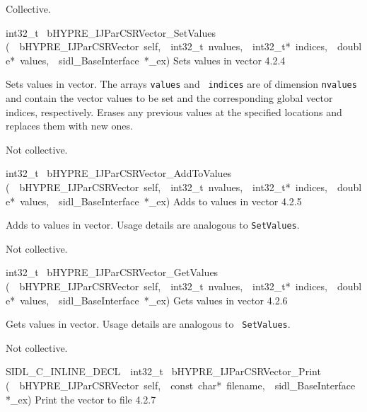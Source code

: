 \documentclass{article}
\begin{document}
\begin{cxxentry}
\begin{cxxentry}
\begin{cxxfunction}
\begin{cxxdoc}
Collective.
\end{cxxdoc}
\end{cxxfunction}
\begin{cxxfunction}
{int32\_t\ }
        {bHYPRE\_IJParCSRVector\_SetValues}
        {(\ \ bHYPRE\_IJParCSRVector\ self,\ \ int32\_t\ nvalues,\ \ int32\_t*\ indices,\ \ double*\ values,\ \ sidl\_BaseInterface\ *\_ex)}
        {
Sets values in vector}
        {4.2.4}
\begin{cxxdoc}

Sets values in vector.  The arrays {\tt values} and {\tt
indices} are of dimension {\tt nvalues} and contain the
vector values to be set and the corresponding global vector
indices, respectively.  Erases any previous values at the
specified locations and replaces them with new ones.

Not collective.
\end{cxxdoc}
\end{cxxfunction}
\begin{cxxfunction}
{int32\_t\ }
        {bHYPRE\_IJParCSRVector\_AddToValues}
        {(\ \ bHYPRE\_IJParCSRVector\ self,\ \ int32\_t\ nvalues,\ \ int32\_t*\ indices,\ \ double*\ values,\ \ sidl\_BaseInterface\ *\_ex)}
        {
Adds to values in vector}
        {4.2.5}
\begin{cxxdoc}

Adds to values in vector.  Usage details are analogous to
{\tt SetValues}.

Not collective.
\end{cxxdoc}
\end{cxxfunction}
\begin{cxxfunction}
{int32\_t\ }
        {bHYPRE\_IJParCSRVector\_GetValues}
        {(\ \ bHYPRE\_IJParCSRVector\ self,\ \ int32\_t\ nvalues,\ \ int32\_t*\ indices,\ \ double*\ values,\ \ sidl\_BaseInterface\ *\_ex)}
        {
Gets values in vector}
        {4.2.6}
\begin{cxxdoc}

Gets values in vector.  Usage details are analogous to {\tt
SetValues}.

Not collective.
\end{cxxdoc}
\end{cxxfunction}
\begin{cxxfunction}
{SIDL\_C\_INLINE\_DECL\ \ int32\_t\ }
        {bHYPRE\_IJParCSRVector\_Print}
        {(\ \ bHYPRE\_IJParCSRVector\ self,\ \ const\ char*\ filename,\ \ sidl\_BaseInterface\ *\_ex)}
        {
Print the vector to file}
        {4.2.7}
\begin{cxxdoc}


\end{cxxdoc}
\end{cxxfunction}
\end{cxxentry}
\end{cxxentry}
\end{document}
